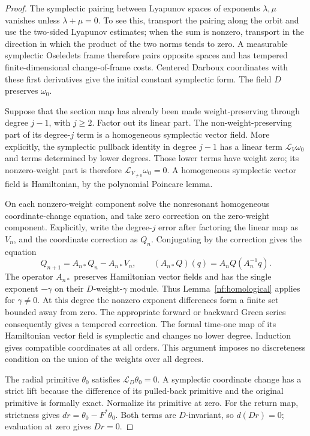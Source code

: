 \begin{proof}
The symplectic pairing between Lyapunov spaces of exponents
$\lambda,\mu$ vanishes unless $\lambda+\mu=0$.  To see this, transport
the pairing along the orbit and use the two-sided Lyapunov estimates;
when the sum is nonzero, transport in the direction in which the
product of the two norms tends to zero.  A measurable symplectic
Oseledets frame therefore pairs opposite spaces and has tempered
finite-dimensional change-of-frame costs.  Centered Darboux
coordinates with these first derivatives give the initial constant
symplectic form.  The field $D$ preserves $\omega_0$.

Suppose that the section map has already been made weight-preserving
through degree $j-1$, with $j\ge2$.  Factor out its linear part.  The
non-weight-preserving part of its degree-$j$ term is a homogeneous
symplectic vector field.  More explicitly, the symplectic pullback
identity in degree $j-1$ has a linear term
$\mathcal L_V\omega_0$ and terms determined by lower degrees.  Those
lower terms have weight zero; its nonzero-weight part is therefore
$\mathcal L_{V_{\ne0}}\omega_0=0$.  A homogeneous symplectic vector
field is Hamiltonian, by the polynomial Poincare lemma.

On each nonzero-weight component solve the nonresonant homogeneous
coordinate-change equation, and take zero correction on the
zero-weight component.  Explicitly, write the degree-$j$ error after
factoring the linear map as $V_n$, and the coordinate correction as
$Q_n$.  Conjugating by the correction gives the equation
\[
 Q_{n+1}=A_{n*}Q_n-A_{n*}V_n,
 \qquad (A_{n*}Q)(q)=A_nQ(A_n^{-1}q).
\]
The operator $A_{n*}$ preserves Hamiltonian vector fields and has
the single exponent $-\gamma$ on their $D$-weight-$\gamma$ module.
Thus Lemma~\ref{nf:homological} applies for $\gamma\ne0$.  At this
degree the nonzero exponent differences form a finite set bounded
away from zero.  The appropriate forward or backward Green series
consequently gives a tempered correction.
The formal time-one map of its Hamiltonian vector field is
symplectic and changes no lower degree.  Induction gives compatible
coordinates at all orders.  This argument imposes no discreteness
condition on the union of the weights over all degrees.

The radial primitive $\theta_0$ satisfies
$\mathcal L_D\theta_0=0$.  A symplectic coordinate change has a strict
lift because the difference of its pulled-back primitive and the
original primitive is formally exact.  Normalize its primitive at
zero.  For the return map, strictness gives
$dr=\theta_0-F^*\theta_0$.  Both terms are $D$-invariant, so $d(Dr)=0$;
evaluation at zero gives $Dr=0$.


\end{proof}
